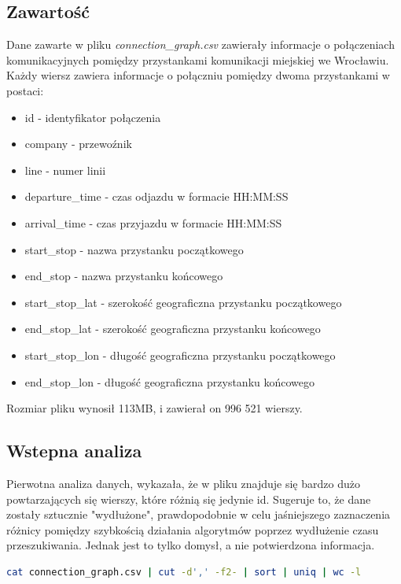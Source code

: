 \documentclass[a4paper, 12pt]{article}
\begin{document}
  \subsection{Zawartość}
  Dane zawarte w pliku \textit{connection\_graph.csv} zawierały informacje o połączeniach komunikacyjnych
  pomiędzy przystankami komunikacji miejskiej we Wrocławiu. Każdy wiersz zawiera informacje o połączniu pomiędzy dwoma przystankami w postaci:
  \begin{itemize}
    \item id - identyfikator połączenia
    \item company - przewoźnik
    \item line - numer linii
    \item departure\_time - czas odjazdu w formacie HH:MM:SS
    \item arrival\_time - czas przyjazdu w formacie HH:MM:SS
    \item start\_stop - nazwa przystanku początkowego
    \item end\_stop - nazwa przystanku końcowego
    \item start\_stop\_lat - szerokość geograficzna przystanku początkowego
    \item end\_stop\_lat - szerokość geograficzna przystanku końcowego
    \item start\_stop\_lon - długość geograficzna przystanku początkowego
    \item end\_stop\_lon - długość geograficzna przystanku końcowego
  \end{itemize}
  Rozmiar pliku wynosił 113MB, i zawierał on 996 521 wierszy.


  \subsection{Wstepna analiza}
    Pierwotna analiza danych, wykazała, że w pliku znajduje się bardzo dużo 
    powtarzających się wierszy, które różnią się jedynie id. Sugeruje to, że dane zostały sztucznie "wydłużone",
    prawdopodobnie w celu jaśniejszego zaznaczenia różnicy pomiędzy szybkością działania algorytmów poprzez wydłużenie
    czasu przeszukiwania. Jednak jest to tylko domysł, a nie potwierdzona informacja.  \\

    \begin{lstlisting}[language=bash]
      cat connection_graph.csv | cut -d',' -f2- | sort | uniq | wc -l
    \end{lstlisting}
\end{document}
